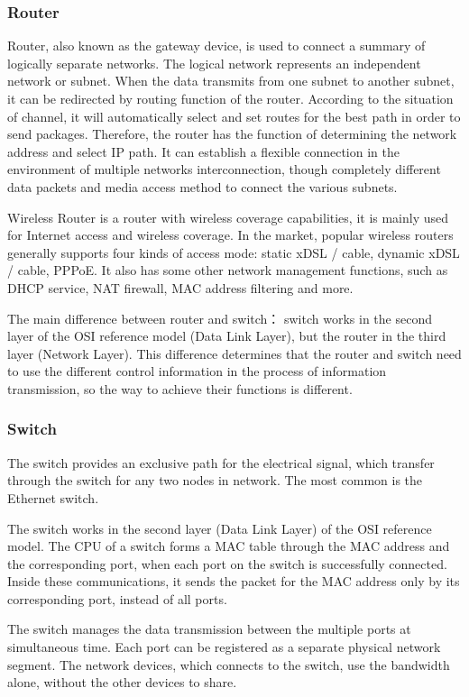 \subsubsection{Router}
Router, also known as the gateway device, is used to connect a summary of logically separate networks. The logical network represents an independent network or subnet. When the data transmits from one subnet to another subnet, it can be redirected by routing function of the router. According to the situation of channel, it will automatically select and set routes for the best path in order to send packages. Therefore, the router has the function of determining the network address and select IP path. It can establish a flexible connection in the environment of multiple networks interconnection, though completely different data packets and media access method to connect the various subnets. 

Wireless Router is a router with wireless coverage capabilities, it is mainly used for Internet access and wireless coverage. In the market, popular wireless routers generally supports four kinds of access mode: static xDSL / cable, dynamic xDSL / cable, PPPoE. It also has some other network management functions, such as DHCP service, NAT firewall, MAC address filtering and more. 

The main difference between router and switch： switch works in the second layer of the OSI reference model (Data Link Layer),  but the router in the third layer (Network Layer). This difference determines that the router and switch need to use the different control information in the process of information transmission, so the way to achieve their functions is different. 

\subsubsection{Switch}

The switch provides an exclusive path for the electrical signal, which transfer through the switch for any two nodes in network. The most common is the Ethernet switch.  

The switch works in the second layer (Data Link Layer) of the OSI reference model. The CPU of a switch forms a MAC table through the MAC address and the corresponding port, when each port on the switch is successfully connected. Inside these communications, it sends the packet for the MAC address only by its corresponding port, instead of all ports.  

The switch manages the data transmission between the multiple ports at simultaneous time. Each port can be registered as a separate physical network segment. The network devices, which connects to the switch, use the bandwidth alone, without the other devices to share.

